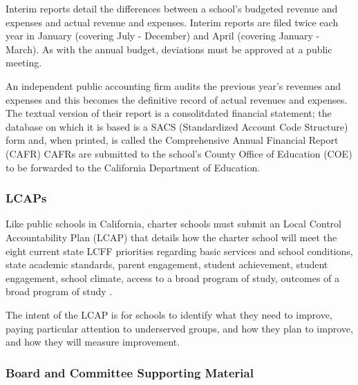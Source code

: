 Interim reports detail the differences between a school's budgeted revenue and expenses and actual revenue and expenses. Interim reports are filed twice each year in January (covering July - December) and April (covering January - March). As with the annual budget, deviations must be approved at a public meeting.

An independent public accounting firm audits the previous year's revenues and expenses and this becomes the definitive record of actual revenues and expenses. The textual version of their report is a consolitdated financial statement; the database on which it is based is a SACS (Standardized Account Code Structure) form and, when printed, is called the Comprehensive Annual Financial Report (CAFR)  CAFRs are submitted to the school's County Office of Education (COE) to be forwarded to the California Department of Education. 

\subsubsection{LCAPs}\label{sec:cs-lcaps}\indent%

Like public schools in California, charter schools must submit an Local Control Accountability Plan (LCAP) that details how the charter school will meet the eight current state LCFF priorities regarding basic services and school conditions, state academic standards, parent engagement, student achievement, student engagement, school climate, access to a broad program of study, outcomes of a broad program of study \parencite[67–68]{Aguinaldo.etal2023}.

The intent of the LCAP is for schools to identify what they need to improve, paying particular attention to underserved groups, and how they plan to improve, and how they will measure improvement. 

\subsubsection{Board and Committee Supporting Material}\label{sec:board-committee-packets}\indent%

